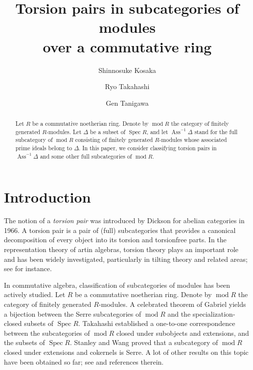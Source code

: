 \documentclass{amsart}
\theoremstyle{definition}
\theoremstyle{remark}
\def\Ass{\operatorname{Ass}}
\def\mod{\operatorname{mod}}
\def\Spec{\operatorname{Spec}}
\begin{document}
\allowdisplaybreaks
\title[Torsion pairs in subcategories of modules over a commutative ring]{Torsion pairs in subcategories of modules\\
over a commutative ring}
\author{Shinnosuke Kosaka}
\address{Graduate School of Mathematics, Nagoya University, Furocho, Chikusaku, Nagoya 464-8602, Japan}
\author{Ryo Takahashi}
\address{Graduate School of Mathematics, Nagoya University, Furocho, Chikusaku, Nagoya 464-8602, Japan}
\author{Gen Tanigawa}
\address{Graduate School of Mathematics, Nagoya University, Furocho, Chikusaku, Nagoya 464-8602, Japan}

\begin{abstract}
Let $R$ be a commutative noetherian ring. 
Denote by $\mod R$ the category of finitely generated $R$-modules. 
Let $\Delta$ be a subset of $\Spec R$, and let $\Ass^{-1}\Delta$ stand for the full subcategory of $\mod R$ consisting of finitely generated $R$-modules whose associated prime ideals belong to $\Delta$.
In this paper, we consider classifying torsion pairs in $\Ass^{-1}\Delta$ and some other full subcategories of $\mod R$.
\end{abstract}

\maketitle

\section{Introduction}

The notion of a {\em torsion pair} was introduced by Dickson \cite{D} for abelian categories in 1966. 
A torsion pair is a pair of (full) subcategories that provides a canonical decomposition of every object into its torsion and torsionfree parts. 
In the representation theory of artin algebras, torsion theory plays an important role and has been widely investigated, particularly in tilting theory and related areas; see \cite{ASS} for instance.

In commutative algebra, classification of subcategories of modules has been actively studied.
Let $R$ be a commutative noetherian ring. 
Denote by $\mod R$ the category of finitely generated $R$-modules. 
A celebrated theorem of Gabriel \cite{G} yields a bijection between the Serre subcategories of $\mod R$ and the specialization-closed subsets of $\Spec R$. 
Takahashi \cite{T} established a one-to-one correspondence between the subcategories of $\mod R$ closed under subobjects and extensions, and the subsets of $\Spec R$.
Stanley and Wang \cite{SW} proved that a subcategory of $\mod R$ closed under extensions and cokernels is Serre.
A lot of other results on this topic have been obtained so far; see \cite{crspd,Ho,K,arg,dlr} and references therein.
\end{document}
